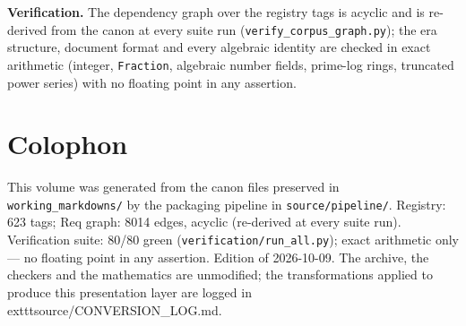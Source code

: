 \documentclass[11pt,openany]{book}
\theoremstyle{canonplain}
\theoremstyle{canondef}
\begin{document}
\noindent\textbf{Verification.}\quad
The dependency graph over the registry tags is acyclic and is re-derived from
the canon at every suite run (\texttt{verify\_corpus\_graph.py}); the era
structure, document format and every algebraic identity are checked in exact
arithmetic (integer, \texttt{Fraction}, algebraic number fields, prime-log
rings, truncated power series) with no floating point in any assertion.

\tableofcontents
\mainmatter




\appendix


\chapter*{Colophon}
This volume was generated from the canon files preserved in
\texttt{working\_markdowns/} by the packaging pipeline in \texttt{source/pipeline/}.
Registry: 623 tags; Req graph: 8014
edges, acyclic (re-derived at every suite run). Verification suite: 80/80 green
(\texttt{verification/run\_all.py}); exact arithmetic only --- no floating
point in any assertion. Edition of 2026-10-09. The archive,
the checkers and the mathematics are unmodified; the transformations applied
to produce this presentation layer are logged in
	exttt{source/CONVERSION\_LOG.md}.
\end{document}
